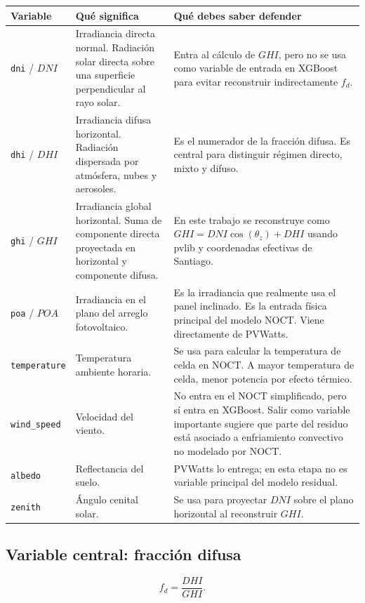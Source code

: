 \documentclass[11pt, letterpaper]{article}
\newcommand{\fd}{f_d}
\begin{document}
\begin{longtable}{p{3.0cm}p{5.1cm}p{6.0cm}}
\toprule
\textbf{Variable} & \textbf{Qu\'e significa} & \textbf{Qu\'e debes saber defender} \\
\midrule
\endhead
\texttt{dni} / \(DNI\) & Irradiancia directa normal. Radiaci\'on solar directa sobre una superficie perpendicular al rayo solar. & Entra al c\'alculo de \(GHI\), pero no se usa como variable de entrada en XGBoost para evitar reconstruir indirectamente \(\fd\). \\
\texttt{dhi} / \(DHI\) & Irradiancia difusa horizontal. Radiaci\'on dispersada por atm\'osfera, nubes y aerosoles. & Es el numerador de la fracci\'on difusa. Es central para distinguir r\'egimen directo, mixto y difuso. \\
\texttt{ghi} / \(GHI\) & Irradiancia global horizontal. Suma de componente directa proyectada en horizontal y componente difusa. & En este trabajo se reconstruye como \(GHI = DNI\cos(\theta_z)+DHI\) usando pvlib y coordenadas efectivas de Santiago. \\
\texttt{poa} / \(POA\) & Irradiancia en el plano del arreglo fotovoltaico. & Es la irradiancia que realmente usa el panel inclinado. Es la entrada f\'isica principal del modelo NOCT. Viene directamente de PVWatts. \\
\texttt{temperature} & Temperatura ambiente horaria. & Se usa para calcular la temperatura de celda en NOCT. A mayor temperatura de celda, menor potencia por efecto t\'ermico. \\
\texttt{wind\_speed} & Velocidad del viento. & No entra en el NOCT simplificado, pero s\'i entra en XGBoost. Salir como variable importante sugiere que parte del residuo est\'a asociado a enfriamiento convectivo no modelado por NOCT. \\
\texttt{albedo} & Reflectancia del suelo. & PVWatts lo entrega; en esta etapa no es variable principal del modelo residual. \\
\texttt{zenith} & \'Angulo cenital solar. & Se usa para proyectar \(DNI\) sobre el plano horizontal al reconstruir \(GHI\). \\
\bottomrule
\end{longtable}

\subsection{Variable central: fracci\'on difusa}

\[
    \fd = \frac{DHI}{GHI}.
\]
\end{document}
